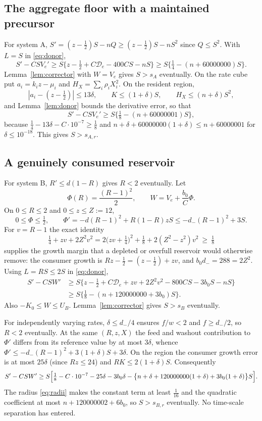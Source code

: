 \documentclass[11pt,a4paper]{article}
\theoremstyle{plain}
\theoremstyle{definition}
\theoremstyle{remark}
\newcommand{\D}{\mathcal D}
\begin{document}
\subsection{The aggregate floor with a maintained precursor}
For system A, $S'=(z-\tfrac12)S-nQ\ge(z-\tfrac12)S-nS^2$ since $Q\le S^2$. With $L=S$ in \eqref{eq:donor},
\begin{equation}\label{eq:aggA}
S'-CSV_e'\ge S\bigl\{z-\tfrac12+C\D_e-400CS-nS\bigr\}\ge S\bigl\{\tfrac14-(n+60000000)S\bigr\}.
\end{equation}
Lemma~\ref{lem:corrector} with $W=V_e$ gives $S>s_A$ eventually. On the rate cube put $a_i=k_iz-\mu_i$ and $H_X=\sum_i\rho_iX_i^2$. On the resident region,
\[
|a_i-(z-\tfrac12)|\le13\delta,\qquad K\le(1+\delta)S,\qquad H_X\le(n+\delta)S^2,
\]
and Lemma~\ref{lem:donor} bounds the derivative error, so that
\[
S'-CSV_e'\ge S\bigl\{\tfrac18-(n+60000001)S\bigr\},
\]
because $\tfrac14-13\delta-C\cdot10^{-7}\ge\tfrac18$ and $n+\delta+60000000(1+\delta)\le n+60000001$ for $\delta\le10^{-18}$. This gives $S>s_{A,r}$.

\subsection{A genuinely consumed reservoir}\label{sec:reservoir}
For system B, $R'\le d(1-R)$ gives $R<2$ eventually. Let
\[
\Phi(R)=\frac{(R-1)^2}2,\qquad W=V_e+\frac{b_0}C\Phi .
\]
On $0\le R\le2$ and $0\le z\le Z:=12$,
\begin{equation}\label{eq:phi}
0\le\Phi\le\tfrac12,\qquad
\Phi'=-d(R-1)^2+R(1-R)zS\le-d_-(R-1)^2+3S .
\end{equation}
For $v=R-1$ the exact identity
\begin{equation}\label{eq:square}
\tfrac14+zv+2Z^2v^2=2\bigl(zv+\tfrac14\bigr)^2+\tfrac18+2(Z^2-z^2)v^2\ \ge\ \tfrac18
\end{equation}
supplies the growth margin that a depleted or overfull reservoir would otherwise remove: the consumer growth is $Rz-\tfrac12=(z-\tfrac12)+zv$, and $b_0d_-=288=2Z^2$. Using $L=RS\le2S$ in \eqref{eq:donor},
\begin{align*}
S'-CSW'&\ge S\bigl\{z-\tfrac12+C\D_e+zv+2Z^2v^2-800CS-3b_0S-nS\bigr\}\\
&\ge S\bigl\{\tfrac18-(n+120000000+3b_0)S\bigr\}.
\end{align*}
Also $-K_0\le W\le U_B$. Lemma~\ref{lem:corrector} gives $S>s_B$ eventually.

For independently varying rates, $\delta\le d_-/4$ ensures $f/w<2$ and $f\ge d_-/2$, so $R<2$ eventually. At the same $(R,z,X)$ the feed and washout contribution to $\Phi'$ differs from its reference value by at most $3\delta$, whence $\Phi'\le-d_-(R-1)^2+3(1+\delta)S+3\delta$. On the region the consumer growth error is at most $25\delta$ (since $Rz\le24$) and $RK\le2(1+\delta)S$. Consequently
\[
S'-CSW'\ge S\Bigl[\tfrac18-C\cdot10^{-7}-25\delta-3b_0\delta-\bigl\{n+\delta+120000000(1+\delta)+3b_0(1+\delta)\bigr\}S\Bigr].
\]
The radius \eqref{eq:radii} makes the constant term at least $\tfrac1{16}$ and the quadratic coefficient at most $n+120000002+6b_0$, so $S>s_{B,r}$ eventually. No time-scale separation has entered.
\end{document}
